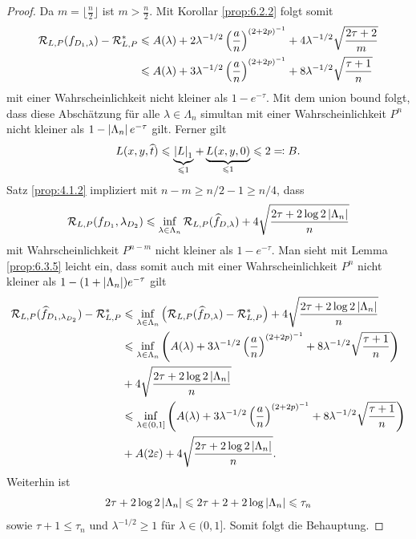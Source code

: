 \begin{proof}
Da $m=\lfloor\frac{n}{2}\rfloor$ ist $m> \frac{n}{2}$. Mit Korollar
\ref{prop:6.2.2} folgt somit
\begin{align*}
\mathcal{R}_{L,P}(f_{D_1,\lambda} ) - \mathcal{R}_{L,P}^*  &\leqslant A(\lambda) +
2\lambda^{-1/2}\left(\frac{a}{n}\right)^{(2+2p)^{-1}} +
4\lambda^{-1/2}\sqrt{\frac{2\tau+2}{m}}\\
&\leqslant A(\lambda) + 3\lambda^{-1/2}\left(\frac{a}{n}\right)^{(2+2p)^{-1}}
+ 8\lambda^{-1/2}\sqrt{\frac{\tau+1}{n}}
\end{align*}
mit einer Wahrscheinlichkeit nicht kleiner als $1-e^{-\tau}$. Mit dem union
bound folgt, dass diese Abschätzung für alle $\lambda\in \Lambda_n$ simultan mit
einer Wahrscheinlichkeit $P^n$ nicht kleiner als $1-\left|\Lambda_n\right|e^{-\tau}$
gilt.
Ferner gilt
\begin{align*}
L(x,y,\cut{t}) \le \underbrace{\abs{L}_1}_{\le 1} + \underbrace{L(x,y,0)}_{\le
1} \le 2 \defr B.
\end{align*}
Satz \ref{prop:4.1.2} impliziert mit $n-m \ge n/2-1\ge n/4$, dass
\begin{align*}
\RR_{L,P}(f_{D_1},\lambda_{D_2}) \le
\inf_{\lambda\in \Lambda_n}  \RR_{L,P}(\cut{f}_{D,\lambda}) +
4\sqrt{\frac{2\tau + 2\log 2\abs{\Lambda_n}}{n}} 
\end{align*}
mit Wahrscheinlichkeit $P^{n-m}$ nicht kleiner als $1-e^{-\tau}$. Man sieht mit
Lemma \ref{prop:6.3.5} leicht ein, dass somit auch mit einer Wahrscheinlichkeit
$P^n$ nicht kleiner als $1-(1+\left|\Lambda_n\right|)e^{-\tau}$ gilt
\begin{align*}
\RR_{L,P}(\cut{f}_{D_1,\lambda_{D_2}}) - \RR_{L,P}^* 
&\le \inf_{\lambda\in \Lambda_n}  \left(\RR_{L,P}(\cut{f}_{D,\lambda}) -
\RR_{L,P}^*\right) + 4\sqrt{\frac{2\tau + 2\log 2\abs{\Lambda_n}}{n}}\\
&\le
\inf_{\lambda\in \Lambda_n}
\left( A(\lambda)+ 3\lambda^{-1/2}\left(\frac{a}{n} \right)^{(2+2p)^{-1}}
+ 8\lambda^{-1/2}\sqrt{\frac{\tau+1}{n}}
\right)\\
&+ 4\sqrt{\frac{2\tau+2\log 2\abs{\Lambda_n}}{n}}\\
&\le
\inf_{\lambda\in (0,1]}
\left(A(\lambda) + 3\lambda^{-1/2}\left(\frac{a}{n} \right)^{(2+2p)^{-1}}+
8\lambda^{-1/2}\sqrt{\frac{\tau+1}{n}} \right)\\
& + A(2\ep)
+ 4\sqrt{\frac{2\tau+2\log 2\abs{\Lambda_n}}n}.
\end{align*}
Weiterhin ist
\begin{align*}
2\tau + 2\log 2 \left|\Lambda_n\right|
\leqslant 2\tau + 2 + 2\log \left|\Lambda_n\right|
\leqslant \tau_n 
\end{align*}
sowie $\tau+1\le \tau_n$ und $\lambda^{-1/2}\ge 1$ für $\lambda\in (0,1]$. Somit
folgt die Behauptung.\qedhere
\end{proof}

